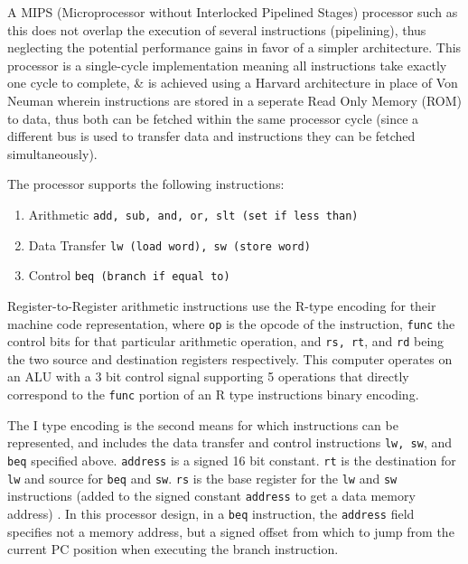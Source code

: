A MIPS (Microprocessor without Interlocked Pipelined Stages) processor such as this does not overlap the execution of several instructions (pipelining), thus neglecting the potential performance gains in favor of a simpler architecture. This processor is a single-cycle implementation meaning all instructions take exactly one cycle to complete, \& is achieved using a Harvard architecture in place of Von Neuman wherein instructions are stored in a seperate Read Only Memory (ROM) to data, thus both can be fetched within the same processor cycle (since a different bus is used to transfer data and instructions they can be fetched simultaneously). 

The processor supports the following instructions:
\begin{enumerate}
    \item Arithmetic \texttt{add, sub, and, or, slt (set if less than)}
    \item Data Transfer \texttt{lw (load word), sw (store word)}
    \item Control \texttt{beq (branch if equal to)}
\end{enumerate} 
Register-to-Register arithmetic instructions use the R-type encoding for their machine code representation, where \texttt{op} is the opcode of the instruction, \texttt{func} the control bits for that particular arithmetic operation, and \texttt{rs, rt}, and \texttt{rd} being the two source and destination registers respectively. This computer operates on an ALU with a 3 bit control signal supporting 5 operations that directly correspond to the \texttt{func} portion of an R type instructions binary encoding. 

\bigskip


\bigskip

The I type encoding is the second means for which instructions can be represented, and includes the data transfer and control instructions \texttt{lw, sw}, and \texttt{beq} specified above. \texttt{address} is a signed 16 bit constant. \texttt{rt} is the destination for \texttt{lw} and source for \texttt{beq} and \texttt{sw}. \texttt{rs} is the base register for the \texttt{lw} and \texttt{sw} instructions (added to the signed constant \texttt{address} to get a data memory address) \textcite{MIPS-uw}. In this processor design, in a \texttt{beq} instruction, the \texttt{address} field specifies not a memory address, but a signed offset from which to jump from the current PC position when executing the branch instruction.

